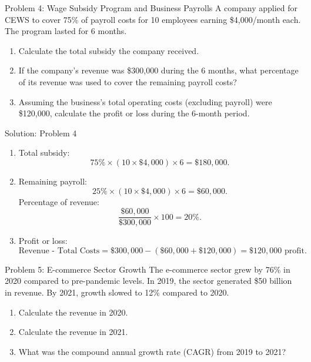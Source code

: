 \documentclass{beamer}
\begin{document}
\begin{frame}{Problem 4: Wage Subsidy Program and Business Payrolls}
A company applied for CEWS to cover 75\% of payroll costs for 10 employees earning \$4,000/month each. The program lasted for 6 months.

\begin{enumerate}
    \item Calculate the total subsidy the company received.
    \item If the company’s revenue was \$300,000 during the 6 months, what percentage of its revenue was used to cover the remaining payroll costs?
    \item Assuming the business’s total operating costs (excluding payroll) were \$120,000, calculate the profit or loss during the 6-month period.
\end{enumerate}
\end{frame}

\begin{frame}{Solution: Problem 4}
\begin{enumerate}
    \item Total subsidy: 
    \[
    75\% \times (10 \times \$4,000) \times 6 = \$180,000.
    \]
    \item Remaining payroll: 
    \[
    25\% \times (10 \times \$4,000) \times 6 = \$60,000.
    \]
    Percentage of revenue: 
    \[
    \frac{\$60,000}{\$300,000} \times 100 = 20\%.
    \]
    \item Profit or loss: 
    \[
    \text{Revenue - Total Costs} = \$300,000 - (\$60,000 + \$120,000) = \$120,000 \text{ profit}.
    \]
\end{enumerate}
\end{frame}



\begin{frame}{Problem 5: E-commerce Sector Growth}
The e-commerce sector grew by 76\% in 2020 compared to pre-pandemic levels. In 2019, the sector generated \$50 billion in revenue. By 2021, growth slowed to 12\% compared to 2020.

\begin{enumerate}
    \item Calculate the revenue in 2020.
    \item Calculate the revenue in 2021.
    \item What was the compound annual growth rate (CAGR) from 2019 to 2021?
\end{enumerate}
\end{frame}
\end{document}
